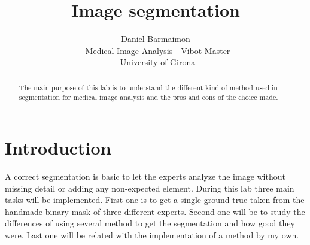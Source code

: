 \documentclass[a4paper, 10pt, conference]{ieeeconf}        %
\begin{document}
\title{\LARGE \bf
Image segmentation
}

\author{ \parbox{3 in}{\centering Daniel Barmaimon \\
         \ Medical Image Analysis - Vibot Master\\
         \ University of Girona\\         
}}

\maketitle

\graphicspath{{./images/}}






\begin{abstract}

The main purpose of this lab is to understand the different kind of method used in segmentation for medical image analysis and the pros and cons of the choice made.
\end{abstract}


\section{Introduction}
A correct segmentation is basic to let the experts analyze the image without missing detail or adding any non-expected element. During this lab three main tasks will be implemented. First one is to get a single ground true taken from the handmade binary mask of three different experts. Second one will be to study the differences of using several method to get the segmentation and how good they were. Last one will be related with the implementation of a method by my own.
\end{document}
